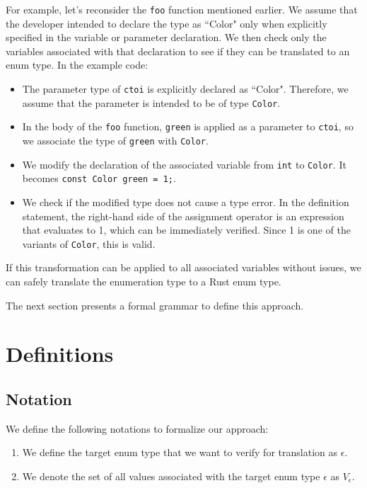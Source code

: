 \documentclass[10pt,conference]{IEEEtran}
\begin{document}
For example, let's reconsider the \texttt{foo} function mentioned earlier. We assume that the developer intended to declare the type as ``Color" only when explicitly specified in the variable or parameter declaration. We then check only the variables associated with that declaration to see if they can be translated to an enum type. In the example code:
\begin{itemize}
    \item The parameter type of \texttt{ctoi} is explicitly declared as ``Color". Therefore, we assume that the parameter is intended to be of type \texttt{Color}.
    \item In the body of the \texttt{foo} function, \texttt{green} is applied as a parameter to \texttt{ctoi}, so we associate the type of \texttt{green} with \texttt{Color}.
    \item We modify the declaration of the associated variable from \texttt{int} to \texttt{Color}. It becomes \texttt{const Color green = 1;}.
    \item We check if the modified type does not cause a type error. In the definition statement, the right-hand side of the assignment operator is an expression that evaluates to 1, which can be immediately verified. Since 1 is one of the variants of \texttt{Color}, this is valid.
\end{itemize}


If this transformation can be applied to all associated variables without issues, we can safely translate the enumeration type to a Rust enum type.

The next section presents a formal grammar to define this approach.

\section{Definitions}

\subsection{Notation}
We define the following notations to formalize our approach:

\begin{enumerate}
    \item We define the target enum type that we want to verify for translation as $\epsilon$.
    \item We denote the set of all values associated with the target enum type $\epsilon$ as $V_\epsilon$.
\end{enumerate}
\end{document}
